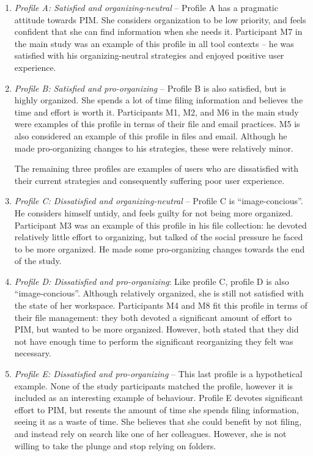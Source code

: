 \begin{enumerate}

\item \textit{Profile A: Satisfied and organizing-neutral} -- Profile A has a pragmatic attitude towards PIM.  She considers organization to be low priority, and feels confident that she can find information when she needs it.  %
Participant M7 in the main study was an example of this profile in all tool contexts -- he was satisfied with his organizing-neutral strategies and enjoyed positive user experience.

\item \textit{Profile B: Satisfied and pro-organizing} -- Profile B is also satisfied, but is highly organized. She spends a lot of time filing information and believes the time and effort is worth it.  Participants M1, M2, and M6 in the main study were examples of this profile in terms of their file and email practices.  M5 is also considered an example of this profile in files and email.  Although he made pro-organizing changes to his strategies, these were relatively minor.

The remaining three profiles are examples of users who are dissatisfied with their current strategies and consequently suffering poor user experience.

\item \textit{Profile C: Dissatisfied and organizing-neutral} -- Profile C is ``image-concious''.  He considers himself untidy, and feels guilty for not being more organized.  Participant M3 was an example of this profile in his file collection: he devoted relatively little effort to organizing, but talked of the social pressure he faced to be more organized.  He made some pro-organizing changes towards the end of the study.

\item \textit{Profile D: Dissatisfied and pro-organizing}:  Like profile C, profile D is also ``image-concious''.  Although relatively organized, she is still not satisfied with the state of her workspace. Participants M4 and M8 fit this profile in terms of their file management: they both devoted a significant amount of effort to PIM, but wanted to be more organized.  However, both stated that they did not have enough time to perform the significant reorganizing they felt was necessary.  

\item	\textit{Profile E: Dissatisfied and pro-organizing} -- This last profile is a hypothetical example.  None of the study participants matched the profile, however it is included as an interesting example of behaviour.  Profile E devotes significant effort to PIM, but resents the amount of time she spends filing information, seeing it as a waste of time.  She believes that she could benefit by not filing, and instead rely on search like one of her colleagues. However, she is not willing to take the plunge and stop relying on folders.  

\end{enumerate}

